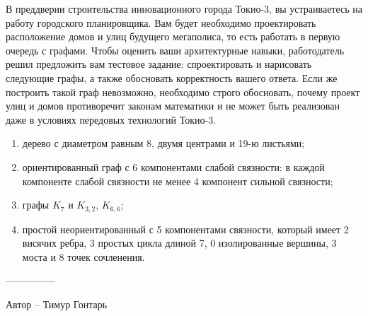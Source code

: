 \question
В преддверии строительства инновационного города Токио-3, вы устраиваетесь на работу городского планировщика. Вам будет необходимо проектировать расположение домов и улиц будущего мегаполиса, то есть работать в первую очередь с графами. Чтобы оценить ваши архитектурные навыки, работодатель решил предложить вам тестовое задание: спроектировать и нарисовать следующие графы, а также обосновать корректность вашего ответа. Если же построить такой граф невозможно, необходимо строго обосновать, почему проект улиц и домов противоречит законам математики и не может быть реализован даже в условиях передовых технологий Токио-3.

\begin{enumerate}
\item  дерево с диаметром равным 8, двумя центрами  и  19-ю листьями;
\item  ориентированный граф с 6 компонентами слабой связности: в  каждой компоненте слабой связности не менее 4 компонент сильной связности;
\item  графы $K_7$ и $K_{3,2}$, $K_{6,6}$;
\item  простой неориентированный с 5 компонентами связности, который имеет 2 висячих ребра, 3 простых цикла длиной 7, 0 изолированные вершины, 3 моста и 8 точек сочленения.
\end{enumerate}

---------------

Автор -- Тимур Гонтарь
